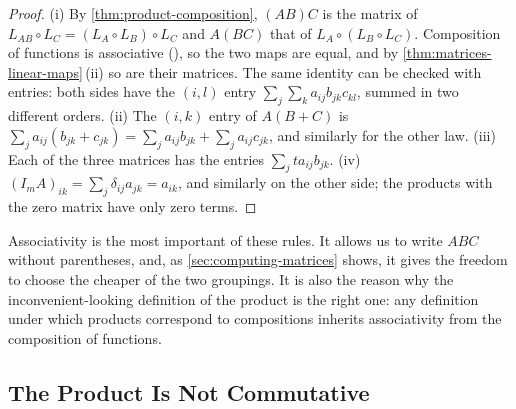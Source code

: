 \begin{proof}
(i) By \cref{thm:product-composition}, $(AB)C$ is the matrix of $L_{AB}\circ L_C=(L_A\circ L_B)\circ L_C$ and $A(BC)$ that of $L_A\circ(L_B\circ L_C)$. Composition of functions is associative (), so the two maps are equal, and by \cref{thm:matrices-linear-maps}\,(ii) so are their matrices. The same identity can be checked with entries: both sides have the $(i,l)$ entry $\sum_j\sum_ka_{ij}b_{jk}c_{kl}$, summed in two different orders. (ii) The $(i,k)$ entry of $A(B+C)$ is $\sum_ja_{ij}(b_{jk}+c_{jk})=\sum_ja_{ij}b_{jk}+\sum_ja_{ij}c_{jk}$, and similarly for the other law. (iii) Each of the three matrices has the entries $\sum_jta_{ij}b_{jk}$. (iv) $(I_mA)_{ik}=\sum_j\delta_{ij}a_{jk}=a_{ik}$, and similarly on the other side; the products with the zero matrix have only zero terms.
\end{proof}

Associativity is the most important of these rules. It allows us to write $ABC$ without parentheses, and, as \cref{sec:computing-matrices} shows, it gives the freedom to choose the cheaper of the two groupings. It is also the reason why the inconvenient-looking definition of the product is the right one: any definition under which products correspond to compositions inherits associativity from the composition of functions.

\subsection{The Product Is Not Commutative}

